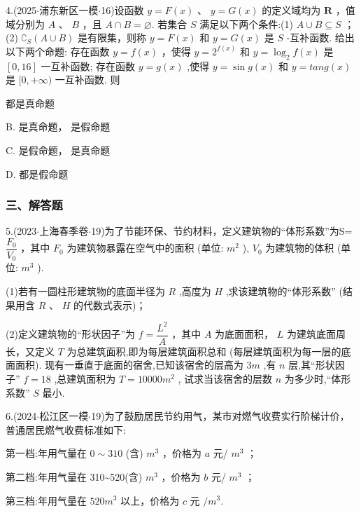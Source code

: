 4.(2025$\cdot$浦东新区一模$\cdot$16)设函数 $y = F\left( x\right)$ 、 $y = G\left( x\right)$ 的定义域均为 $\mathbf{R}$ ，值域分别为 $A$ 、 $B$ ，且 $A \cap  B = \varnothing$. 若集合 $S$ 满足以下两个条件:(1) $A \cup  B \subseteq  S$ ；(2) ${\complement }_{S}\left( {A \cup  B}\right)$ 是有限集，则称 $y = F\left( x\right)$ 和 $y = G\left( x\right)$ 是 $S$ -互补函数. 给出以下两个命题:   存在函数 $y = f\left( x\right)$ ，使得 $y = {2}^{f\left( x\right) }$ 和 $y = {\log }_{2}f\left( x\right)$ 是 $\left\lbrack  {0,{16}}\right\rbrack$ 一互补函数;    存在函数 $y = g\left( x\right)$ ,使得 $y = \sin g\left( x\right)$ 和 $y = {tang}\left( x\right)$ 是 $\lbrack 0, + \infty )$ 一互补函数. 则 \dotfill{(\kh{})}

\xx{}{}{}{}    都是真命题

B.   是真命题，  是假命题

C.   是假命题，  是真命题

D.     都是假命题

\subsubsection*{三、解答题}

5.(2023$\cdot$上海春季卷$\cdot$19)为了节能环保、节约材料，定义建筑物的“体形系数”为S= $\dfrac{{F}_{0}}{{V}_{0}}$ ，其中 ${F}_{0}$ 为建筑物暴露在空气中的面积 (单位: ${{m}}^{2}$ ), ${V}_{0}$ 为建筑物的体积 (单位: ${{m}}^{3}$ ).

(1)若有一圆柱形建筑物的底面半径为 $R$ ,高度为 $H$ ,求该建筑物的“体形系数” (结果用含 $R$ 、 $H$ 的代数式表示)；

(2)定义建筑物的“形状因子”为 $f = \dfrac{{L}^{2}}{A}$ ，其中 $A$ 为底面面积， $L$ 为建筑底面周长，又定义 $T$ 为总建筑面积,即为每层建筑面积总和 (每层建筑面积为每一层的底面面积). 现有一垂直于底面的宿舍,已知该宿舍的层高为 $3{m}$ ,有 $n$ 层,其“形状因子” $f = {18}$ ,总建筑面积为 $T = {10000}{{m}}^{2}$ , 试求当该宿舍的层数 $n$ 为多少时,“体形系数” $S$ 最小.

6.(2024$\cdot$松江区一模$\cdot$19)为了鼓励居民节约用气，某市对燃气收费实行阶梯计价，普通居民燃气收费标准如下:

第一档:年用气量在 $0 \sim  {310}$ (含) ${{m}}^{3}$ ，价格为 $a$ 元/ ${{m}}^{3}$ ；

第二档:年用气量在 310\textasciitilde 520(含) ${{m}}^{3}$ ，价格为 $b$ 元/ ${{m}}^{3}$ ；

第三档:年用气量在 ${520}{{m}}^{3}$ 以上，价格为 $c$ 元 $/{{m}}^{3}$.

